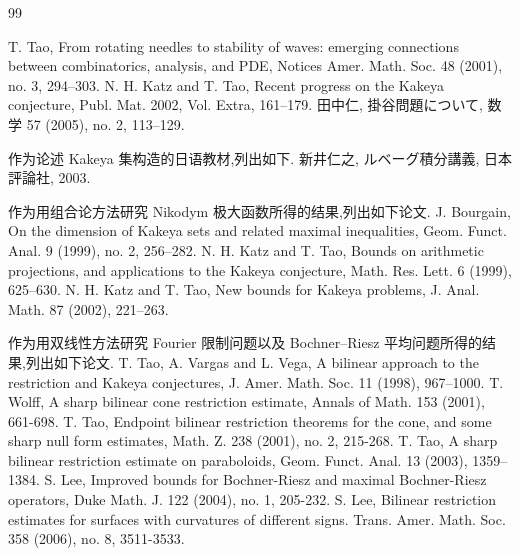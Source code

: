 \begin{thebibliography}{99}
\begin{sloppypar}
 T. Tao, From rotating needles to stability of waves: emerging connections between combinatorics, analysis, and PDE, Notices Amer. Math. Soc. 48 (2001), no. 3, 294--303.
 N. H. Katz and T. Tao, Recent progress on the Kakeya conjecture, Publ. Mat. 2002, Vol. Extra, 161--179.
 {\japonfont 田中仁, 掛谷問題について,} 数学 57 (2005), no. 2, 113--129.
\item[] 作为论述 Kakeya 集构造的日语教材,列出如下.
 {\japonfont 新井仁之, ルベーグ積分講義, 日本評論社,} 2003.
\item[] 作为用组合论方法研究 Nikodym 极大函数所得的结果,列出如下论文.
 J. Bourgain, On the dimension of Kakeya sets and related maximal inequalities, Geom. Funct. Anal. 9 (1999), no. 2, 256--282.
 N. H. Katz and T. Tao, Bounds on arithmetic projections, and applications to the Kakeya conjecture, Math. Res. Lett. 6 (1999), 625--630.
 N. H. Katz and T. Tao, New bounds for Kakeya problems, J. Anal. Math. 87 (2002), 221--263.
\item[] 作为用双线性方法研究 Fourier 限制问题以及 Bochner--Riesz 平均问题所得的结果,列出如下论文.
 T. Tao, A. Vargas and L. Vega, A bilinear approach to the restriction and Kakeya conjectures, J. Amer. Math. Soc. 11 (1998), 967--1000.
 T. Wolff, A sharp bilinear cone restriction estimate, Annals of Math. 153 (2001), 661-698.
 T. Tao, Endpoint bilinear restriction theorems for the cone, and some sharp null form estimates, Math. Z. 238 (2001), no. 2, 215-268.
 T. Tao, A sharp bilinear restriction estimate on paraboloids, Geom. Funct. Anal. 13 (2003), 1359--1384.
 S. Lee, Improved bounds for Bochner-Riesz and maximal Bochner-Riesz operators, Duke Math. J. 122 (2004), no. 1, 205-232.
 S. Lee, Bilinear restriction estimates for surfaces with curvatures of different signs. Trans. Amer. Math. Soc. 358 (2006), no. 8, 3511-3533.
\end{sloppypar}
\end{thebibliography}